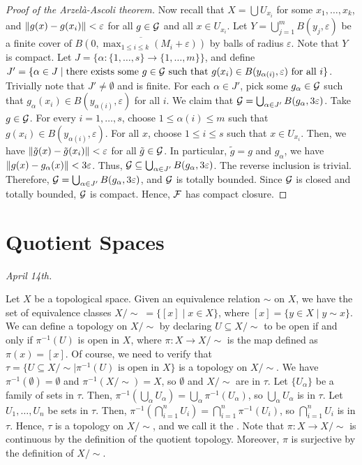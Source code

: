 \begin{proof}[Proof of the Arzelà-Ascoli theorem]
    Now recall that $X = \bigcup U_{x_{i}}$ for some $x_{1},\ldots,x_{k}$, and $\left\lVert g(x)-g(x_{i})\right\rVert < \varepsilon$ for all $g \in \mathcal{G}$ and all $x \in U_{x_{i}}$. Let $Y = \bigcup_{j=1}^{m} B(y_{j},\varepsilon)$ be a finite cover of $\overline{B(0,\max_{1 \leq i \leq k} (M_{i} + \varepsilon))}$ by balls of radius $\varepsilon$. Note that $Y$ is compact. Let $J = \{\alpha : \{1,\ldots,s\} \to \{1,\ldots,m\}\}$, and define $J' = \{\alpha \in J \mid \text{there exists some } g \in \mathcal{G} \text{ such that } g(x_{i}) \in B(y_{\alpha(i)},\varepsilon) \text{ for all } i\}$. Trivially note that $J' \neq \emptyset$ and is finite. For each $\alpha \in J'$, pick some $g_{\alpha} \in \mathcal{G}$ such that $g_{\alpha}(x_{i}) \in B(y_{\alpha(i)},\varepsilon)$ for all $i$. We claim that $\mathcal{G} = \bigcup_{\alpha \in J'} B(g_{\alpha},3\varepsilon)$. Take $g \in \mathcal{G}$. For every $i = 1,\ldots,s$, choose $1 \leq \alpha(i) \leq m$ such that $g(x_{i}) \in B(y_{\alpha(i)},\varepsilon)$. For all $x$, choose $1 \leq i \leq s$ such that $x \in U_{x_{i}}$. Then, we have $\left\lVert\tilde{g}(x)-\tilde{g}(x_{i})\right\rVert < \varepsilon$ for all $\tilde{g} \in \mathcal{G}$. In particular, $\tilde{g} = g$ and $g_{\alpha}$, we have $\left\lVert g(x)-g_{\alpha}(x)\right\rVert < 3\varepsilon$. Thus, $\mathcal{G} \subseteq \bigcup_{\alpha \in J'} B(g_{\alpha},3\varepsilon)$. The reverse inclusion is trivial. Therefore, $\mathcal{G} = \bigcup_{\alpha \in J'} B(g_{\alpha},3\varepsilon)$, and $\mathcal{G}$ is totally bounded. Since $\mathcal{G}$ is closed and totally bounded, $\mathcal{G}$ is compact. Hence, $\mathcal{F}$ has compact closure.
\end{proof}

\section{Quotient Spaces}
\textit{April 14th.}

Let $X$ be a topological space. Given an equivalence relation $\sim$ on $X$, we have the set of equivalence classes $X/\!\sim \; = \{[x] \mid x \in X\}$, where $[x] = \{y \in X \mid y \sim x\}$. We can define a topology on $X/\!\sim$ by declaring $U \subseteq X/\!\sim$ to be open if and only if $\pi^{-1}(U)$ is open in $X$, where $\pi : X \to X/\!\sim$ is the map defined as $\pi(x) = [x]$. Of course, we need to verify that $\tau = \{ U \subseteq X/\!\sim \mid \pi^{-1}(U) \text{ is open in } X\}$ is a topology on $X/\!\sim$. We have $\pi^{-1}(\emptyset) = \emptyset$ and $\pi^{-1}(X/\!\sim) = X$, so $\emptyset$ and $X/\!\sim$ are in $\tau$. Let $\{U_{\alpha}\}$ be a family of sets in $\tau$. Then, $\pi^{-1}(\bigcup_{\alpha} U_{\alpha}) = \bigcup_{\alpha} \pi^{-1}(U_{\alpha})$, so $\bigcup_{\alpha} U_{\alpha}$ is in $\tau$. Let $U_{1},\ldots,U_{n}$ be sets in $\tau$. Then, $\pi^{-1}(\bigcap_{i=1}^{n} U_{i}) = \bigcap_{i=1}^{n} \pi^{-1}(U_{i})$, so $\bigcap_{i=1}^{n} U_{i}$ is in $\tau$. Hence, $\tau$ is a topology on $X/\!\sim$, and we call it the . Note that $\pi : X \to X/\!\sim$ is continuous by the definition of the quotient topology. Moreover, $\pi$ is surjective by the definition of $X/\!\sim$.

